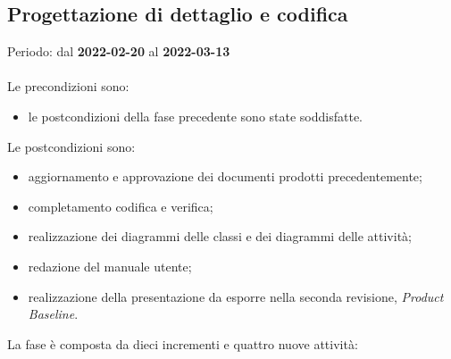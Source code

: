 \subsection{Progettazione di dettaglio e codifica}
Periodo: dal \textbf{2022-02-20} al \textbf{2022-03-13} \mbox{} \\ \mbox{} \\
Le precondizioni sono:
\begin{itemize}
	\item le postcondizioni della fase precedente sono state soddisfatte.
\end{itemize}

Le postcondizioni sono:
\begin{itemize}
	\item aggiornamento e approvazione dei documenti prodotti precedentemente;
	\item completamento codifica e verifica;
	\item realizzazione dei diagrammi delle classi e dei diagrammi delle attività;
	\item redazione del manuale utente;
	\item realizzazione della presentazione da esporre nella seconda revisione, \textit{Product Baseline}. 
\end{itemize}
La fase è composta da dieci incrementi e quattro nuove attività:
